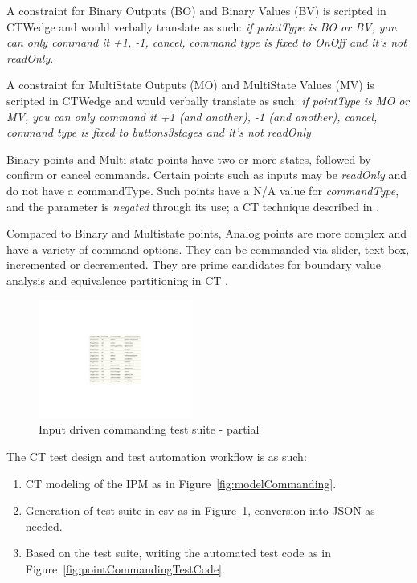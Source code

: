 \documentclass[conference]{IEEEtran}
\begin{document}
	A constraint for Binary Outputs (BO) and Binary Values (BV) is scripted in CTWedge and would verbally translate as such:
	\textit{if pointType is BO or BV, you can only command it +1, -1, cancel, command type is fixed to OnOff and it's not readOnly}.
	
	A constraint for MultiState Outputs (MO) and MultiState Values (MV) is scripted in CTWedge and would verbally translate as such:
	\textit{if pointType is MO or MV, you can only command it +1 (and another), -1 (and another), cancel, command type is fixed to buttons3stages and it's not readOnly}

	Binary points and Multi-state points have two or more states, followed by confirm or cancel commands. 
	Certain points such as inputs may be \textit{readOnly} and do not have a commandType. Such points have a N/A value for \textit{commandType}, and the parameter is \textit{negated} through its use; a CT technique described in \cite{segall2012common}.	

	Compared to  Binary and Multistate points, Analog points are more complex and have a variety of command options.
	They can be commanded via slider, text box, incremented or decremented. 
	They are prime candidates for boundary value analysis and equivalence partitioning in CT \cite{segall2012common}.

	\begin{figure}[!t]
		\includegraphics[width=0.45\textwidth,]{csvOutputCommanding.pdf}
		\caption{Input driven commanding test suite - partial}
		\label{fig:csvOutputCommanding}
	\end{figure}

	The CT test design and test automation workflow is as such:
	\begin{enumerate}
		\item CT modeling of the IPM as in Figure~\ref{fig:modelCommanding}.
		\item Generation of test suite in csv as in Figure~\ref{fig:csvOutputCommanding}, conversion into JSON as needed.
		\item Based on the test suite, writing the automated test code as in Figure~\ref{fig:pointCommandingTestCode}.
	\end{enumerate}
\end{document}
